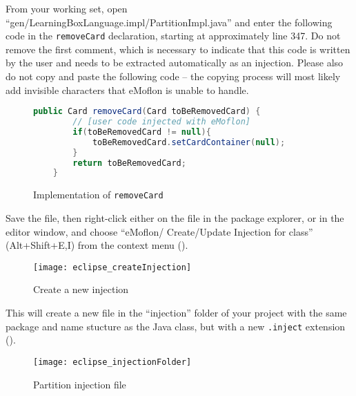 \begin{stepbystep}

\item From your working set, open ``gen/LearningBoxLanguage.impl/Part\-it\-ionImpl.java'' and enter the following code in the
\texttt{removeCard} declaration, starting at approximately line 347. Do not remove the first comment, which is necessary to indicate that this code is written
by the user and needs to be extracted automatically as an injection. Please also do not copy and paste the following code -- the copying process will most
likely add invisible characters that eMoflon is unable to handle.

\vspace{0.5cm}

\begin{figure}[htbp]
        \centering
        \begin{lstlisting}[language=Java, keywordstyle={\bfseries\color{purple}}, backgroundcolor=\color{white}]
    public Card removeCard(Card toBeRemovedCard) {
		// [user code injected with eMoflon]
		if(toBeRemovedCard != null){
			toBeRemovedCard.setCardContainer(null);
		}
		return toBeRemovedCard;
	}
        \end{lstlisting}
        \caption{Implementation of \texttt{removeCard}}
        \label{code:addToStringRep_impl}
\end{figure}

\vspace{0.5cm}

\item Save the file, then right-click either on the file in the package explorer, or in the editor window, and choose ``eMoflon/
Create/Update Injection for class'' (Alt+Shift+E,I) from the context menu ().

\begin{figure}[htbp]
    \centering
    \texttt{[image: eclipse\_createInjection]}
    \caption{Create a new injection}
    \label{eclipse:injection_create_injection}
\end{figure}

\item This will create a new file in the ``injection'' folder of your project with the same package and name stucture as the Java class,
but with a new \texttt{.inject} extension ().

\begin{figure}[htbp]
    \centering
    \texttt{[image: eclipse\_injectionFolder]}
    \caption{Partition injection file}
    \label{eclipse:injection_folder}
\end{figure}


\end{stepbystep}
